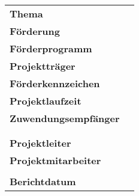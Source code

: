 %
\begin{titlepage}
\thispagestyle{empty} %
%
\vspace*{-3cm} %
%
\vfill
%
\begin{center}
	\huge
	\lasmtype\\
	\normalsize
	\vspace{8ex}
	\huge \textbf
	\lasmtitle\\
	\normalsize
	\vspace{2ex}
	\Large
	\lasmShortTitle\\
	\normalsize
	\vspace{6ex}
	\begin{tabular}{ll}
		\textbf{Thema} 				& \lasmtopic \medskip \\
		\textbf{Förderung} 			& \lasmfunding \medskip \\
		\textbf{Förderprogramm} 	& \lasmfundingProgram \medskip \\
		\textbf{Projektträger}		& \lasmleadPartner \medskip \\
		\textbf{Förderkennzeichen} 	& \lasmfundingReference \medskip \\
		\textbf{Projektlaufzeit} 	& \lasmBeginEndDate \medskip \\
		\textbf{Zuwendungsempfänger}& \lasmuniversityA \\
								 	& \lasmuniversityB \\
	  							 	& \lasmuniversityC \medskip \\
		\textbf{Projektleiter} 		& \lasmprojectLeader \medskip \\
		\textbf{Projektmitarbeiter} & \lasmprojectStaffA \\
 									& \lasmprojectStaffB \medskip \\
		\textbf{Berichtdatum} 		& \lasmdate
\end{tabular}
%
\end{center}
\vfill
%
\end{titlepage}
